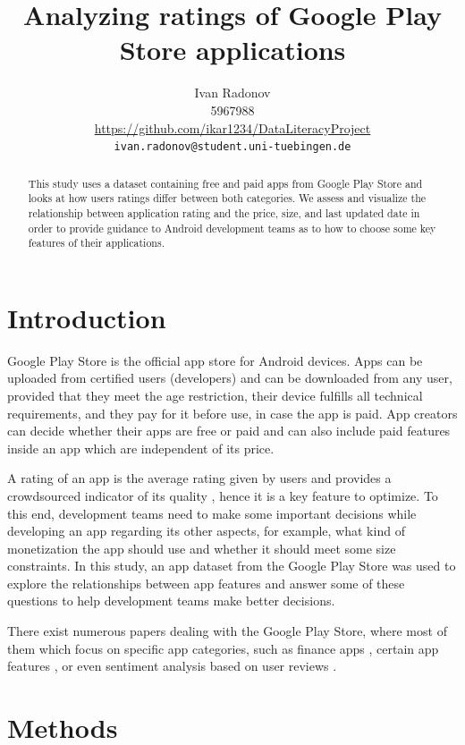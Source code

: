 \documentclass{article}
\title{Analyzing ratings of Google Play Store applications}
\author{%
  Ivan Radonov \\
  5967988 \\
  \url{https://github.com/ikar1234/DataLiteracyProject} \\
  \texttt{ivan.radonov@student.uni-tuebingen.de} \\
  }
\begin{document}
\maketitle

\begin{abstract}
  This study uses a dataset containing free and paid apps from Google Play Store and looks at how users ratings differ between both categories. We assess and visualize the relationship between application rating and the price, size, and last updated date in order to provide guidance to Android development teams as to how to choose some key features of their applications.
\end{abstract}

\section{Introduction}

Google Play Store is the official app store for Android devices. Apps can be uploaded from certified users (developers) and can be downloaded from any user, provided that they meet the age restriction, their device fulfills all technical requirements, and they pay for it before use, in case the app is paid. App creators can decide whether their apps are free or paid and can also include paid features inside an app which are independent of its price.

A rating of an app is the average rating given by users and provides a crowdsourced indicator of its quality \cite{mobileapprating}, hence it is a key feature to optimize. To this end, development teams need to make some important decisions while developing an app regarding its other aspects, for example, what kind of monetization the app should use and whether it should meet some size constraints. In this study, an app dataset from the Google Play Store was used to explore the relationships between app features and answer some of these questions to help development teams make better decisions.

There exist numerous papers dealing with the Google Play Store, where most of them which focus on specific app categories, such as finance apps \cite{financialapps}, certain app features \cite{freshapps}, or even sentiment analysis based on user reviews \cite{sentiment}.

\section{Methods}
\end{document}
